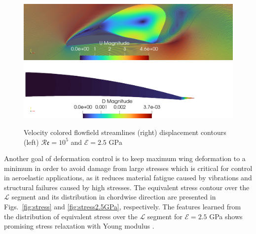 \documentclass[conf]{new-aiaa}
\newcommand{\Rey}{\mathcal{R}\mathfrak{e}}
\begin{document}
%
%
\begin{figure}[ht!]
\centering
\includegraphics[width=0.45\columnwidth]{Figures/streamLines25GPACoupling.png}
\includegraphics[width=0.45\columnwidth]{Figures/DMAgnitude25GPaCoupling.png}
\caption{Velocity colored flowfield streamlines (right) displacement contours (left) $\Rey=10^5$ and $\mathcal{E}=2.5$ GPa}
\label{fig:25GPA}
\end{figure}
Another goal of deformation control is to keep maximum wing deformation to a minimum in order to avoid damage from large stresses which is critical for control in aeroelastic applications, as it reduces material fatigue caused by vibrations and structural failures caused by high stresses.
%
The equivalent stress contour over the $\mathcal{L}$ segment and its distribution in chordwise direction are presented in Figs.~\ref{fig:stress} and \ref{fig:stress2.5GPa}, respectively.
%
The features learned from the distribution of equivalent stress over the $\mathcal{L}$ segment for $\mathcal{E}=2.5$ GPa shows promising stress relaxation with Young modulus .
%
\end{document}
